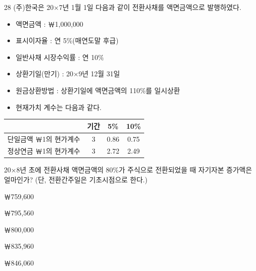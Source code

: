 \begin{question}{28}
(주)한국은 20×7년 1월 1일 다음과 같이 전환사채를 액면금액으로 발행하였다.
\begin{itemize}\setlength\itemsep{0pt}
\item[․] 액면금액 : ￦1,000,000
\item[․] 표시이자율 : 연 5\%(매연도말 후급)
\item[․] 일반사채 시장수익률 : 연 10\%
\item[․] 상환기일(만기) : 20×9년 12월 31일
\item[․] 원금상환방법 : 상환기일에 액면금액의 110\%를 일시상환
\item[․] 현재가치 계수는 다음과 같다.
\end{itemize}

{\small\centering
\begin{tabular}{|l|c|c|c|}
\hline
 & 기간 & 5\% & 10\% \\
\hline
단일금액 ￦1의 현가계수 & 3 & 0.86 & 0.75 \\
\hline
정상연금 ￦1의 현가계수 & 3 & 2.72 & 2.49 \\
\hline
\end{tabular}\par}

20×8년 초에 전환사채 액면금액의 80\%가 주식으로 전환되었을 때 자기자본 증가액은 얼마인가? (단, 전환간주일은 기초시점으로 한다.)
\begin{choices}
  \item ￦759,600
  \item ￦795,560
  \item ￦800,000
  \item ￦835,960
  \item ￦846,060
\end{choices}
\end{question}
